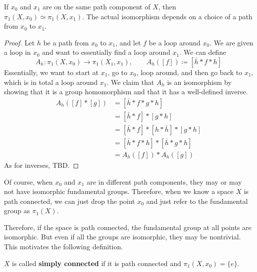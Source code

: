   \begin{theorem}
    If $x_0$ and $x_1$ are on the same path component of $X$, then $\pi_1 (X, x_0) \simeq \pi_1 (X, x_1)$. The actual isomorphism depends on a choice of a path from $x_0$ to $x_1$. 
  \end{theorem}
  \begin{proof}
    Let $h$ be a path from $x_0$ to $x_1$, and let $f$ be a loop around $x_0$. We are given a loop in $x_0$ and want to essentially find a loop around $x_1$. We can define 
    \begin{equation}
      A_h : \pi_1 (X, x_0) \to \pi_1 (X_1, x_1), \qquad A_h([f]) \coloneqq [\bar{h} \ast f \ast h]
    \end{equation}
    Essentially, we want to start at $x_1$, go to $x_0$, loop around, and then go back to $x_1$, which is in total a loop around $x_1$. We claim that $A_h$ is an isomorphism by showing that it is a group homomorphism and that it has a well-defined inverse. 
    \begin{align}
      A_h ([f] \ast [g]) & = [\bar{h} \ast f \ast g \ast h] \\ 
                         & = [\bar{h} \ast f] \ast [g \ast h] \\ 
                         & = [\bar{h} \ast f] \ast [h \ast \bar{h}] \ast [g \ast h] \\ 
                         & = [\bar{h} \ast f \ast h] \ast [\bar{h} \ast g \ast h] \\ 
                         & = A_h ([f]) \ast A_h ([g]) 
    \end{align}
    As for inverses, TBD. 
  \end{proof}

  Of course, when $x_0$ and $x_1$ are in different path components, they may or may not have isomorphic fundamental groups. Therefore, when we know a space $X$ is path connected, we can just drop the point $x_0$ and just refer to the fundamental group as $\pi_1 (X)$. 

  Therefore, if the space is path connected, the fundamental group at all points are isomorphic. But even if all the groups are isomorphic, they may be nontrivial. This motivates the following definition. 
  
  \begin{definition}
    $X$ is called \textbf{simply connected} if it is path connected and $\pi_1 (X, x_0) = \{e\}$. 
  \end{definition}

